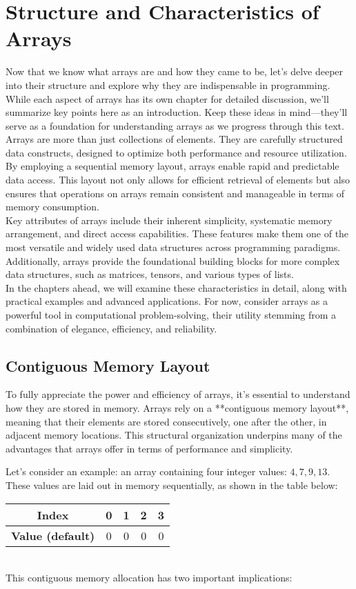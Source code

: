 \documentclass[12pt, oneside]{book}
\begin{document}
	\section{Structure and Characteristics of Arrays}
	Now that we know what arrays are and how they came to be, let’s delve deeper into their structure and explore why they are indispensable in programming. While each aspect of arrays has its own chapter for detailed discussion, we’ll summarize key points here as an introduction. Keep these ideas in mind—they'll serve as a foundation for understanding arrays as we progress through this text.\\
	Arrays are more than just collections of elements. They are carefully structured data constructs, designed to optimize both performance and resource utilization. By employing a sequential memory layout, arrays enable rapid and predictable data access. This layout not only allows for efficient retrieval of elements but also ensures that operations on arrays remain consistent and manageable in terms of memory consumption.\\
	Key attributes of arrays include their inherent simplicity, systematic memory arrangement, and direct access capabilities. These features make them one of the most versatile and widely used data structures across programming paradigms. Additionally, arrays provide the foundational building blocks for more complex data structures, such as matrices, tensors, and various types of lists.\\
	In the chapters ahead, we will examine these characteristics in detail, along with practical examples and advanced applications. For now, consider arrays as a powerful tool in computational problem-solving, their utility stemming from a combination of elegance, efficiency, and reliability.
	\subsection{Contiguous Memory Layout}
	To fully appreciate the power and efficiency of arrays, it’s essential to understand how they are stored in memory. Arrays rely on a **contiguous memory layout**, meaning that their elements are stored consecutively, one after the other, in adjacent memory locations. This structural organization underpins many of the advantages that arrays offer in terms of performance and simplicity.
	
	Let’s consider an example: an array containing four integer values: \(4, 7, 9, 13\). These values are laid out in memory sequentially, as shown in the table below:
	\begin{table}[ht]
		\centering
		\begin{tabular}{|c|c|c|c|c|}
			\hline
			\textbf{Index} & 0 & 1 & 2 & 3 \\ 
			\hline
			\textbf{Value (default)} & 0 & 0 & 0 & 0 \\ 
			\hline
		\end{tabular}
	\end{table}
	\\
	This contiguous memory allocation has two important implications:
	
\end{document}
